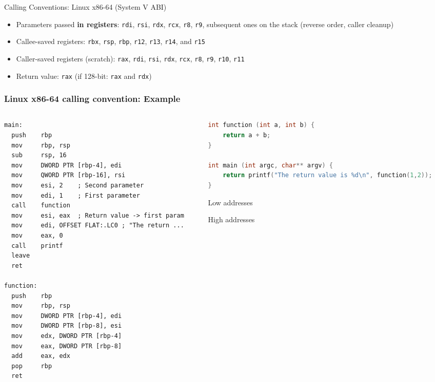 \documentclass[]{beamer}
\begin{document}
\begin{frame}{Calling Conventions: Linux x86-64 (System V ABI)}
\begin{itemize}
\item Parameters passed {\bf in registers}: {\tt rdi}, {\tt rsi}, {\tt rdx}, {\tt rcx}, {\tt r8}, {\tt r9}, subsequent ones on the stack (reverse order, caller cleanup)
\item Callee-saved registers: {\tt rbx}, {\tt rsp}, {\tt rbp}, {\tt r12}, {\tt r13}, {\tt r14}, and {\tt r15}
\item Caller-saved registers (scratch): {\tt rax}, {\tt rdi}, {\tt rsi}, {\tt rdx}, {\tt rcx}, {\tt r8}, {\tt r9}, {\tt r10}, {\tt r11}
\item Return value: {\tt rax} (if 128-bit: {\tt rax} and {\tt rdx})
\end{itemize}
\end{frame}

\begin{frame}[fragile]
  \frametitle{Linux x86-64 calling convention: Example}
  \begin{columns}
    \begin{column}{.5\textwidth}
\begin{lstlisting}[language={[x86masm]Assembler},basicstyle=\tiny\ttfamily]
main:
  push    rbp
  mov     rbp, rsp
  sub     rsp, 16
  mov     DWORD PTR [rbp-4], edi
  mov     QWORD PTR [rbp-16], rsi
  mov     esi, 2    ; Second parameter
  mov     edi, 1    ; First parameter
  call    function
  mov     esi, eax  ; Return value -> first param
  mov     edi, OFFSET FLAT:.LC0 ; "The return ...
  mov     eax, 0
  call    printf
  leave
  ret

function:
  push    rbp
  mov     rbp, rsp
  mov     DWORD PTR [rbp-4], edi
  mov     DWORD PTR [rbp-8], esi
  mov     edx, DWORD PTR [rbp-4]
  mov     eax, DWORD PTR [rbp-8]
  add     eax, edx
  pop     rbp
  ret
\end{lstlisting}
    \end{column}

    \begin{column}{.5\textwidth}

\begin{lstlisting}[language=C,basicstyle=\tiny\ttfamily]
int function (int a, int b) {
    return a + b;
}

int main (int argc, char** argv) {
    return printf("The return value is %d\n", function(1,2));
}
\end{lstlisting}
	\vspace{-2em}
	\begin{center}
    	\par{\scriptsize Low addresses}\\[.5em]
	\par{\scriptsize High addresses}
	\end{center}
    \end{column}
  \end{columns}
\end{frame}
\end{document}
